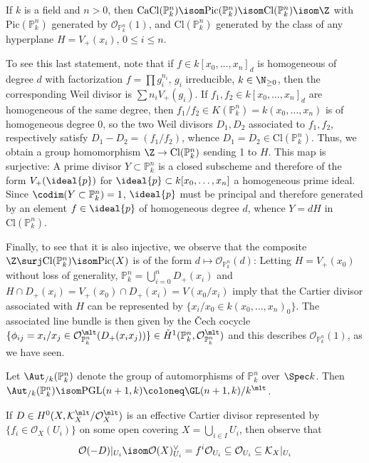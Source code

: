 \documentclass[wip, algebra]{bsteffan-lecturenotes}
\newcommand{\cO}{\mathcal{O}}
\newcommand{\cK}{\mathcal{K}}
\renewcommand{\P}{\mathbb{P}}
\newcommand{\Pic}{\mathrm{Pic}}
\newcommand{\Cl}{\mathrm{Cl}}
\newcommand{\CaCl}{\mathrm{CaCl}}
\newcommand{\PGL}{\mathrm{PGL}}
\begin{document}
\begin{example}
	If $k$ is a field and $n > 0$, then $\CaCl(\P^n_k) \isom \Pic(\P^n_k) \isom \Cl(\P^n_k) \isom \Z$ with $\Pic(\P^n_k)$ generated by $\cO_{\P^n_k}(1)$, and $\Cl(\P^n_k)$ generated by the class of any hyperplane $H = V_+(x_i)$, $0 \leq i \leq n$.

	To see this last statement, note that if $f \in k[x_0, \ldots, x_n]_d$ is homogeneous of degree $d$ with factorization $f = \prod g_i^{n_i}$, $g_i$ irreducible, $k \in \N_{\geq 0}$, then the corresponding Weil divisor is $\sum n_i V_+(g_i)$. 
	If $f_1, f_2 \in k[x_0, \ldots, x_n]_d$ are homogeneous of the same degree, then $f_1 / f_2 \in K(\P^n_k) = k(x_0, \ldots, x_n)$ is of homogeneous degree 0, so the two Weil divisors $D_1, D_2$ associated to $f_1, f_2$, respectively satisfy $D_1 - D_2 = (f_1 / f_2)$, whence $D_1 = D_2 \in \Cl(\P^n_k)$. 
	Thus, we obtain a group homomorphism $\Z \to \Cl(\P^n_k)$ sending 1 to $H$.
	This map is surjective:
	A prime divisor $Y \subset \P^n_k$ is a closed subscheme and therefore of the form $V_+(\ideal{p})$ for $\ideal{p} \subset k[x_0, \ldots, x_n]$ a homogeneous prime ideal.
	Since $\codim(Y \subset \P^n_k) = 1$, $\ideal{p}$ must be principal and therefore generated by an element $f \in \ideal{p}$ of homogeneous degree $d$, whence $Y = dH$ in $\Cl(\P^n_k)$.

	Finally, to see that it is also injective, we observe that the composite $\Z \surj \Cl(\P^n_k) \isom \Pic(X)$ is of the form $d \mapsto \cO_{\P^n_k}(d)$:
	Letting $H = V_+(x_0)$ without loss of generality, $\P^n_k = \bigcup_{i = 0}^n D_+(x_i)$ and $H \cap D_+(x_i) = V_+(x_0) \cap D_+(x_i) = V(x_0 / x_i)$ imply that the Cartier divisor associated with $H$ can be represented by $\{x_i / x_0 \in k(x_0, \ldots, x_n)_0\}$.
	The associated line bundle is then given by the Čech cocycle $\{\phi_{ij} = x_i / x_j \in \cO_{\P^n_k}^\mlt(D_+(x_i x_j))\} \in \check{H}^1(\P^n_k, \cO_{\P^n_k}^\mlt)$ and this describes $\cO_{\P^n_k}(1)$, as we have seen.
\end{example}
\begin{example}
	Let $\Aut_{/k}(\P^n_k)$ denote the group of automorphisms of $\P^n_k$ over $\Spec k$.
	Then $\Aut_{/k}(\P^n_k) \isom \PGL(n + 1, k) \coloneq \GL(n + 1, k) / k^\mlt$.
\end{example}
If $D \in H^0(X, \cK_X^\mlt / \cO_X^\mlt)$ is an effective Cartier divisor represented by $\{f_i \in \cO_X(U_i)\}$ on some open covering $X = \bigcup_{i \in I} U_i$, then observe that
\begin{equation*}
	\cO(-D)|_{U_i} \isom \cO(X)_{U_i}^\vee = f^i \cO_{U_i} \subseteq \cO_{U_i} \subseteq \cK_X|_{U_i}
\end{equation*}
\end{document}

